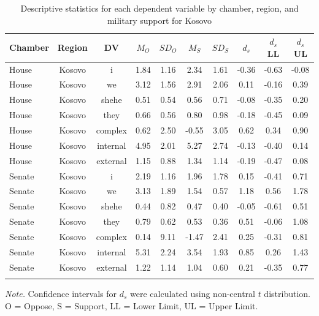 \documentclass[english,,man]{apa6}
\begin{document}
\begin{table}[tbp]
\begin{center}
\begin{threeparttable}
\caption{\label{tab:Ktable}Descriptive statistics for each dependent variable by chamber, 
          region, and military support for Kosovo}
\small{
\begin{tabular}{lccccccccc}
\toprule
Chamber & Region & DV & $M_O$ & $SD_O$ & $M_S$ & $SD_S$ & $d_s$ & $d_s$ LL & $d_s$ UL\\
\midrule
House & Kosovo & i & 1.84 & 1.16 & 2.34 & 1.61 & -0.36 & -0.63 & -0.08\\
House & Kosovo & we & 3.12 & 1.56 & 2.91 & 2.06 & 0.11 & -0.16 & 0.39\\
House & Kosovo & shehe & 0.51 & 0.54 & 0.56 & 0.71 & -0.08 & -0.35 & 0.20\\
House & Kosovo & they & 0.66 & 0.56 & 0.80 & 0.98 & -0.18 & -0.45 & 0.09\\
House & Kosovo & complex & 0.62 & 2.50 & -0.55 & 3.05 & 0.62 & 0.34 & 0.90\\
House & Kosovo & internal & 4.95 & 2.01 & 5.27 & 2.74 & -0.13 & -0.40 & 0.14\\
House & Kosovo & external & 1.15 & 0.88 & 1.34 & 1.14 & -0.19 & -0.47 & 0.08\\
Senate & Kosovo & i & 2.19 & 1.16 & 1.96 & 1.78 & 0.15 & -0.41 & 0.71\\
Senate & Kosovo & we & 3.13 & 1.89 & 1.54 & 0.57 & 1.18 & 0.56 & 1.78\\
Senate & Kosovo & shehe & 0.44 & 0.82 & 0.47 & 0.40 & -0.05 & -0.61 & 0.51\\
Senate & Kosovo & they & 0.79 & 0.62 & 0.53 & 0.36 & 0.51 & -0.06 & 1.08\\
Senate & Kosovo & complex & 0.14 & 9.11 & -1.47 & 2.41 & 0.25 & -0.31 & 0.81\\
Senate & Kosovo & internal & 5.31 & 2.24 & 3.54 & 1.93 & 0.85 & 0.26 & 1.43\\
Senate & Kosovo & external & 1.22 & 1.14 & 1.04 & 0.60 & 0.21 & -0.35 & 0.77\\
\bottomrule
\addlinespace
\end{tabular}
}
\begin{tablenotes}[para]
\normalsize{\textit{Note.} Confidence intervals for $d_s$ were calculated using 
          non-central $t$ distribution. O = Oppose, S = Support, LL = Lower Limit, UL = Upper Limit.}
\end{tablenotes}
\end{threeparttable}
\end{center}
\end{table}
\end{document}

